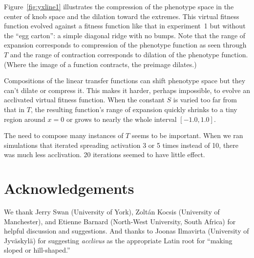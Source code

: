 \documentclass[letterpaper]{article}
\begin{document}
Figure~\ref{fig:yxline1} illustrates the compression of the phenotype space in the center of
knob space and the dilation toward the extremes. This virtual fitness function
evolved against a fitness function like that in experiment~1 but without the
``egg carton'': a simple diagonal ridge with no bumps. Note that the range of
expansion corresponds to compression of the phenotype function as seen through
$T$ and the range of contraction corresponds to dilation of the phenotype
function. (Where the image of a function contracts, the preimage dilates.)

Compositions of the linear transfer functions can shift phenotype space but they
can't dilate or compress it. This makes it harder, perhaps impossible, to
evolve an acclivated virtual fitness function. When the constant $S$ is varied
too far from that in $T$, the resulting function's range of expansion quickly
shrinks to a tiny region around $x=0$ or grows to nearly the whole interval
$[-1.0, 1.0]$.

The need to compose many instances of $T$ seems to be important. When we ran
simulations that iterated spreading activation 3 or 5 times instead of 10,
there was much less acclivation. 20 iterations seemed to have little effect.

%
%
%




\section{Acknowledgements}

We thank Jerry Swan (University of York), Zolt\'an Kocsis (University of
Manchester), and Etienne Barnard (North-West University, South Africa) for
helpful discussion and suggestions. And thanks to Joonas Ilmavirta
(University of Jyv\"askyl\"a) for suggesting \textit{acclivus} as the
appropriate Latin root for ``making sloped or hill-shaped.''


\end{document}
